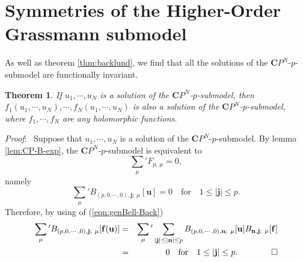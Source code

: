 \documentclass[makeidx,12pt,openany]{report}
\newtheorem{thm}[df]{Theorem}
\begin{document}
\section{Symmetries of the Higher-Order Grassmann submodel}
As well as theorem \ref{thm:backlund}, we find that all the solutions of 
the ${\mathbf{C}}P^N$-$p$-submodel are functionally invariant. 
\begin{thm}
If $u_1,\cdots,u_N$ is a solution of the ${\mathbf{C}}P^N$-$p$-submodel, 
then $f_1(u_1,\cdots,u_N),\cdots,f_N(u_1,\cdots,u_N)$ 
is also a solution of the ${\mathbf{C}}P^N$-$p$-submodel, 
where $f_1,\cdots,f_N$ are any holomorphic functions. 
\end{thm}
%
\textit{Proof}: \ 
Suppose that $u_1,\cdots,u_N$ is a solution of 
the ${\mathbf{C}}P^N$-$p$-submodel. 
By lemma \ref{lem:CP-B-exp}, 
the ${\mathbf{C}}P^N$-$p$-submodel is equivalent to 
\begin{equation}
  \sum_{\mu}{}'F_{p,\, \mu}=0, 
\end{equation}
namely
\begin{equation}
 \sum_{\mu}{}' B_{(p,0,\cdots,0), \mathbf{j};\ \mu}[\mathbf{u}]=0
 \quad \mbox{for} \quad 1 \le |{\mathbf{j}}| \le p. 
\end{equation}
Therefore, by using of (\ref{eqn:genBell-Back})
\begin{eqnarray*}
 \sum_{\mu}{}' B_{(p,0,\cdots,0), \mathbf{j};\ \mu}[\mathbf{f}(\mathbf{u})]
 &=&
 \sum_{\mu}{}' \sum_{|{\mathbf{j}}| \le |{\mathbf{n}}| \le p}
   B_{(p,0,\cdots,0), \mathbf{n};\ \mu}[\mathbf{u}]
   B_{\mathbf{n}, \mathbf{j};\ \mu}[\mathbf{f}] \\
 &=& 0 
 \quad \mbox{for} \quad 1 \le |{\mathbf{j}}| \le p. \qquad \qed
\end{eqnarray*}
\end{document}
